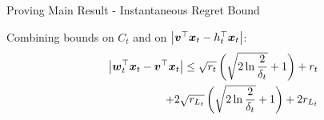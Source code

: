 \documentclass{beamer}
\begin{document}


\begin{frame}{Proving Main Result - Instantaneous Regret Bound}

Combining bounds on $C_t$ and on $\left\vert{{\boldsymbol{v}}}^{\top}{\boldsymbol{x}}_{t}-h_{t}^{\top}{\boldsymbol{x}}_{t}\right\vert$:
\begin{eqnarray}
&&\left\vert{{\boldsymbol{w}}}^{\top}_{t}{\boldsymbol{x}}_{t}-{{\boldsymbol{v}}}^{\top}{\boldsymbol{x}}_{t}\right\vert\leq\sqrt{r_t}\left(\sqrt{2\ln{\frac{2}{\delta_t}}}+1\right)+r_t\nonumber\\
&&+2\sqrt{r_{L_t}}\left(\sqrt{2\ln{\frac{2}{\delta_t}}}+1\right)+2r_{L_t}
\label{triangl_ht_wt2}
\end{eqnarray}

\end{frame}
\end{document}
